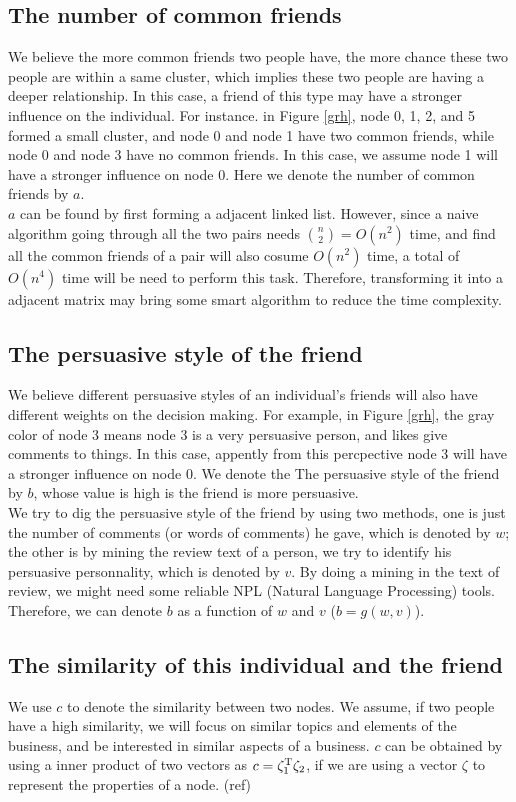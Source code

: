 \documentclass[11pt]{article} %
\newcommand{\Tr}{^{\rm T}}
\newcommand{\1}{{\bf 1}}
\newcommand{\0}{{\bf 0}}
\begin{document}
\subsection{The number of common friends}
We believe the more common friends two people have, the more chance these two people are within a same cluster, which implies these two people are having a deeper relationship. In this case, a friend of this type may have a stronger influence on the individual. For instance. in Figure \ref{grh}, node 0, 1, 2, and 5 formed a small cluster, and node 0 and node 1 have two common friends, while node 0 and node 3 have no common friends. In this case, we assume node 1 will have a stronger influence on node 0. Here we denote the number of common friends by $ a $.\\

$ a $ can be found by first forming a adjacent linked list. However, since a naive algorithm going through all the two pairs needs $ \binom{n}{2}=O(n^{2}) $ time, and find all the common friends of a pair will also cosume $ O(n^{2}) $ time, a total of $ O(n^{4}) $ time will be need to perform this task. Therefore, transforming it into a adjacent matrix may bring some smart algorithm to reduce the time complexity.

\subsection{The persuasive style of the friend}
We believe different persuasive styles of an individual's friends will also have different weights on the decision making. For example, in Figure	\ref{grh}, the gray color of node 3 means node 3 is a very persuasive person, and likes give comments to things. In this case, appently from this percpective node 3 will have a stronger influence on node 0. We denote the The persuasive style of the friend by $ b $, whose value is high is the friend is more persuasive.\\

We try to dig the persuasive style of the friend by using two methods, one is just the number of comments (or words of comments) he gave, which is denoted by $ w $; the other is by mining the review text of a person, we try to identify his persuasive personnality, which is denoted by $ v $. By doing a mining in the text of review, we might need some reliable NPL (Natural Language Processing) tools. Therefore, we can denote $ b $ as a function of $ w $ and $ v $ ($ b=g(w,v) $).

\subsection{The similarity of this individual and the friend}
We use $ c $ to denote the similarity between two nodes. We assume, if two people have a high similarity, we will focus on similar topics and elements of the business, and be interested in similar aspects of a business. $ c $ can be obtained by using a inner product of two vectors as $ c=\zeta_{1} \Tr\zeta_{2} $, if we are using a vector $ \zeta $ to represent the properties of a node. (ref)\\
\end{document}
